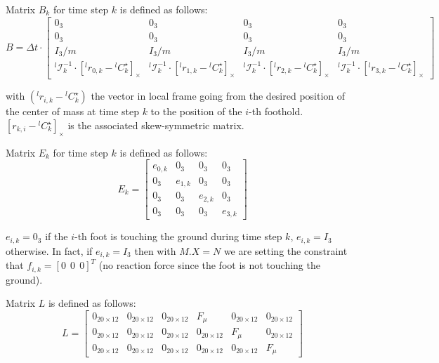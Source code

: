 \documentclass[a4paper,11pt]{article}
\begin{document}
Matrix $B_k$ for time step $k$ is defined as follows:
\begin{equation}
B = \Delta t \cdot \begin{bmatrix} 
0_3 & 0_3 & 0_3 & 0_3 \\
0_3 & 0_3 & 0_3 & 0_3 \\
I_3/m  & I_3/m & I_3/m & I_3/m \\
{}^l\!\mathcal{I}_k^{-1} \cdot [{}^l\! r_{0,k} - {}^l\! C_k^\star]_\times & {}^l\!\mathcal{I}_k^{-1} \cdot [{}^l\! r_{1,k} - {}^l\! C_k^\star]_\times & {}^l\!\mathcal{I}_k^{-1} \cdot [{}^l\! r_{2,k} - {}^l\! C_k^\star]_\times & {}^l\!\mathcal{I}_k^{-1} \cdot [{}^l\! r_{3,k} - {}^l\! C_k^\star]_\times
\end{bmatrix}
\end{equation}

with $({}^l\!r_{i,k} - {}^l\! C_k^\star)$ the vector in local frame going from the desired position of the center of mass at time step $k$ to the position of the $i$-th foothold. $[r_{k,i} - {}^l\! C_k^\star]_\times$ is the associated skew-symmetric matrix.

Matrix $E_k$ for time step $k$ is defined as follows:
\begin{equation}
E_k = \begin{bmatrix} 
e_{0,k} & 0_3 & 0_3 & 0_3 \\
0_3 & e_{1,k} & 0_3 & 0_3 \\
0_3 & 0_3 & e_{2,k} & 0_3 \\
0_3 & 0_3 & 0_3 & e_{3,k}
\end{bmatrix}
\end{equation}

$e_{i,k} = 0_3$ if the $i$-th foot is touching the ground during time step $k$, $e_{i,k} = I_3$ otherwise. In fact, if $e_{i,k} = I_3$ then with $M.X = N$ we are setting the constraint that $f_{i,k} = [0 ~~ 0 ~~ 0]^T$ (no reaction force since the foot is not touching the ground).

Matrix $L$ is defined as follows:
\begin{equation}
L = \begin{bmatrix} 
	0_{20\times12} & 0_{20\times12} & 0_{20\times12}  & F_\mu  & 0_{20\times12} & 0_{20\times12} \\
	0_{20\times12} & 0_{20\times12} & 0_{20\times12}  & 0_{20\times12} & F_\mu  & 0_{20\times12} \\
	0_{20\times12} & 0_{20\times12} & 0_{20\times12}  & 0_{20\times12} & 0_{20\times12} & F_\mu  \end{bmatrix}
\end{equation}
\end{document}
